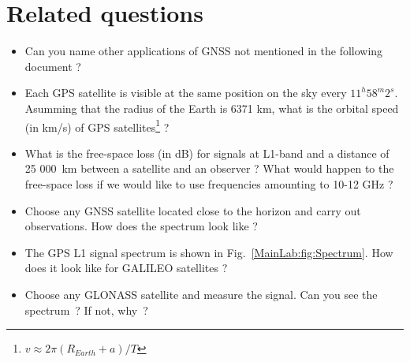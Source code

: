 \section{Related questions}

\begin{itemize}
\item Can you name other applications of GNSS not mentioned in the following document ?
\item Each GPS satellite is visible at the same position on the sky every $11^h58^m2^s$. Asumming that the radius of the Earth is 6371 km, 
what is the orbital speed (in km/s) of GPS satellites\footnote{$v\approx 2\pi(R_{Earth}+a)/T$} ?
\item What is the free-space loss (in dB) for signals at L1-band and a distance of 25 000~km between a satellite and an observer ? What would 
happen to the free-space loss if we would like to use frequencies amounting to 10-12 GHz ?
\item Choose any GNSS satellite located close to the horizon and carry out observations. How does the spectrum look like ?
 \item The GPS L1 signal spectrum is shown in Fig.~\ref{MainLab:fig:Spectrum}. How does it look like for GALILEO satellites ?
 \item Choose any GLONASS satellite and measure the signal. Can you see the spectrum~? If not, why~?

\end{itemize}
